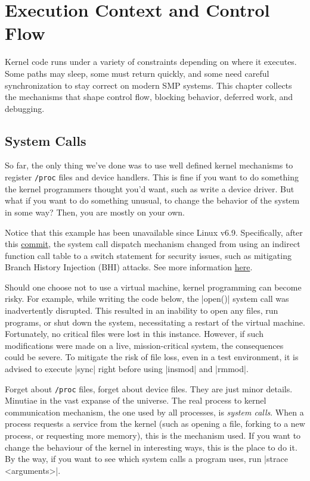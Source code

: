 \documentclass[10pt, oneside]{book}
\begin{document}
\chapter{Execution Context and Control Flow}
Kernel code runs under a variety of constraints depending on where it executes.
Some paths may sleep, some must return quickly, and some need careful
synchronization to stay correct on modern SMP systems. This chapter collects
the mechanisms that shape control flow, blocking behavior, deferred work, and
debugging.

\section{System Calls}
\label{sec:syscall}
So far, the only thing we've done was to use well defined kernel mechanisms to register \verb|/proc| files and device handlers.
This is fine if you want to do something the kernel programmers thought you'd want, such as write a device driver.
But what if you want to do something unusual, to change the behavior of the system in some way?
Then, you are mostly on your own.

Notice that this example has been unavailable since Linux v6.9.
Specifically, after this \href{https://github.com/torvalds/linux/commit/1e3ad78334a69b36e107232e337f9d693dcc9df2#diff-4a16bf89a09b4f49669a30d54540f0b936ea0224dc6ee9edfa7700deb16c3e11R52}{commit}, the system call dispatch mechanism changed from using an indirect function call table to a switch statement for security issues, such as mitigating Branch History Injection (BHI) attacks.
See more information \href{https://bugs.launchpad.net/ubuntu/+source/linux/+bug/2060909}{here}.

Should one choose not to use a virtual machine, kernel programming can become risky.
For example, while writing the code below, the \cpp|open()| system call was inadvertently disrupted.
This resulted in an inability to open any files, run programs, or shut down the system, necessitating a restart of the virtual machine.
Fortunately, no critical files were lost in this instance.
However, if such modifications were made on a live, mission-critical system, the consequences could be severe.
To mitigate the risk of file loss, even in a test environment, it is advised to execute \sh|sync| right before using \sh|insmod| and \sh|rmmod|.

Forget about \verb|/proc| files, forget about device files.
They are just minor details.
Minutiae in the vast expanse of the universe.
The real process to kernel communication mechanism, the one used by all processes, is \emph{system calls}.
When a process requests a service from the kernel (such as opening a file, forking to a new process, or requesting more memory), this is the mechanism used.
If you want to change the behaviour of the kernel in interesting ways, this is the place to do it.
By the way, if you want to see which system calls a program uses, run \sh|strace <arguments>|.
\end{document}
